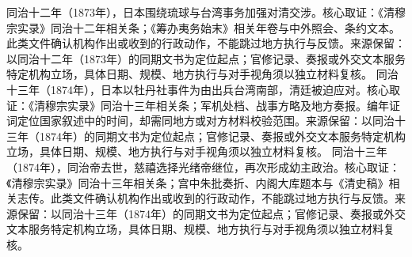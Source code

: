 同治十二年（1873年），日本围绕琉球与台湾事务加强对清交涉。核心取证：《清穆宗实录》同治十二年相关条；《筹办夷务始末》相关年卷与中外照会、条约文本。此类文件确认机构作出或收到的行政动作，不能跳过地方执行与反馈。来源保留：以同治十二年（1873年）的同期文书为定位起点；官修记录、奏报或外交文本服务特定机构立场，具体日期、规模、地方执行与对手视角须以独立材料复核。
同治十三年（1874年），日本以牡丹社事件为由出兵台湾南部，清廷被迫应对。核心取证：《清穆宗实录》同治十三年相关条；军机处档、战事方略及地方奏报。编年证词定位国家叙述中的时间，却需同地方或对方材料校验范围。来源保留：以同治十三年（1874年）的同期文书为定位起点；官修记录、奏报或外交文本服务特定机构立场，具体日期、规模、地方执行与对手视角须以独立材料复核。
同治十三年（1874年），同治帝去世，慈禧选择光绪帝继位，再次形成幼主政治。核心取证：《清穆宗实录》同治十三年相关条；宫中朱批奏折、内阁大库题本与《清史稿》相关志传。此类文件确认机构作出或收到的行政动作，不能跳过地方执行与反馈。来源保留：以同治十三年（1874年）的同期文书为定位起点；官修记录、奏报或外交文本服务特定机构立场，具体日期、规模、地方执行与对手视角须以独立材料复核。
